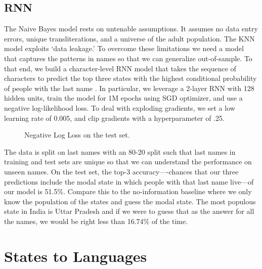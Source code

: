 \documentclass[11pt,  letterpaper]{article}
\begin{document}
\subsection{RNN}

The Naive Bayes model rests on untenable assumptions. It assumes no data entry errors, unique transliterations, and a universe of the adult population. The KNN model exploits `data leakage.' To overcome these limitations we need a model that captures the patterns in names so that we can generalize out-of-sample. To that end, we build a character-level RNN model that takes the sequence of characters to predict the top three states with the highest conditional probability of people with the last name \citep{10.1145/3426826.3426842, 8469258}. In particular, we leverage a 2-layer RNN with 128 hidden units, train the model for 1M epochs using SGD optimizer, and use a negative log-likelihood loss. To deal with exploding gradients, we set a low learning rate of 0.005, and clip gradients with a hyperparameter of .25.


\begin{figure}[b]
  \centering
  \caption{Negative Log Loss on the test set.}
  \label{fig:rf_het_TE}
\end{figure}

The data is split on last names with an 80-20 split such that last names in training and test sets are unique so that we can understand the performance on unseen names. On the test set, the top-3 accuracy—-chances that our three predictions include the modal state in which people with that last name live—of our model is 51.5\%. Compare this to the no-information baseline where we only know the population of the states and guess the modal state. The most populous state in India is Uttar Pradesh and if we were to guess that as the answer for all the names, we would be right less than 16.74\% of the time.

\section{States to Languages}
\end{document}

